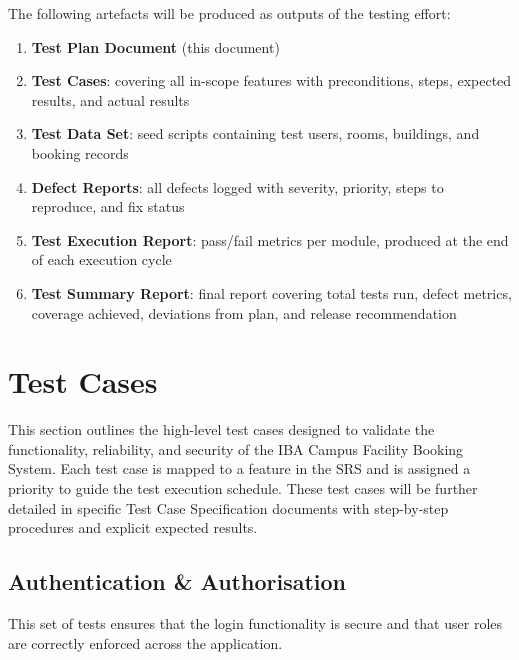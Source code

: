 \documentclass[12pt, a4paper]{article}
\begin{document}
The following artefacts will be produced as outputs of the testing effort:

\begin{enumerate}
  \item \textbf{Test Plan Document} (this document) 
  \item \textbf{Test Cases}: covering all in-scope features with preconditions, steps, expected results, and actual results
  \item \textbf{Test Data Set}: seed scripts containing test users, rooms, buildings, and booking records
  \item \textbf{Defect Reports}: all defects logged with severity, priority, steps to reproduce, and fix status
  \item \textbf{Test Execution Report}: pass/fail metrics per module, produced at the end of each execution cycle
  \item \textbf{Test Summary Report}: final report covering total tests run, defect metrics, coverage achieved, deviations from plan, and release recommendation
\end{enumerate}

\newpage
\section{Test Cases}

This section outlines the high-level test cases designed to validate the functionality, reliability, and security of the IBA Campus Facility Booking System. Each test case is mapped to a feature in the SRS and is assigned a priority to guide the test execution schedule. These test cases will be further detailed in specific Test Case Specification documents with step-by-step procedures and explicit expected results.

\subsection{Authentication \& Authorisation }

This set of tests ensures that the login functionality is secure and that user roles are correctly enforced across the application.
\end{document}
